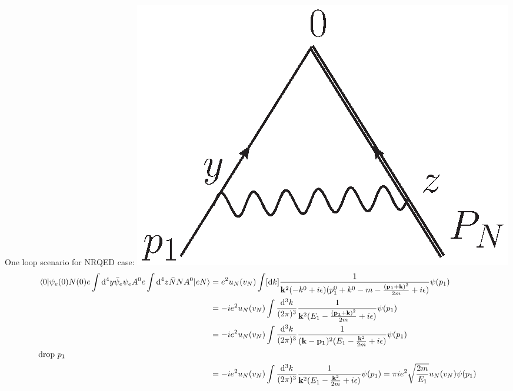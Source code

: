 \documentclass{article}
\begin{document}
 One loop scenario for NRQED case:
 \includegraphics[width=1.2 in]{OPE-1.eps}
 \begin{align*}
    \mel{0}{\psi_e(0)N(0)e\int\dd^4y\bar\psi_e\psi_e A^0e\int\dd^4z\bar NNA^0}{eN}&=e^2u_N(v_N)\int[\dd k]\frac{1}{\vb{k}^2(-k^0+i\epsilon)(p_1^0+k^0-m-\frac{\vb{(p_1+k)}^2}{2m}+i\epsilon)}\psi(p_1)\\
  &=-ie^2u_N(v_N)\int\frac{\dd^3k}{(2\pi)^3}\frac{1}{\vb{k}^2(E_1-\frac{\vb{(p_1+k)}^2}{2m}+i\epsilon)}\psi(p_1)\\
  &=-ie^2u_N(v_N)\int\frac{\dd^3k}{(2\pi)^3}\frac{1}{(\vb{k}-\vb{p_1})^2(E_1-\frac{\vb{k}^2}{2m}+i\epsilon)}\psi(p_1)\\
  \intertext{drop $p_1$}
  &=-ie^2u_N(v_N)\int\frac{\dd^3k}{(2\pi)^3}\frac{1}{\vb{k}^2(E_1-\frac{\vb{k}^2}{2m}+i\epsilon)}\psi(p_1)=\pi ie^2\sqrt{\frac{2m}{E_1}}u_N(v_N)\psi(p_1)
 \end{align*}
\end{document}
